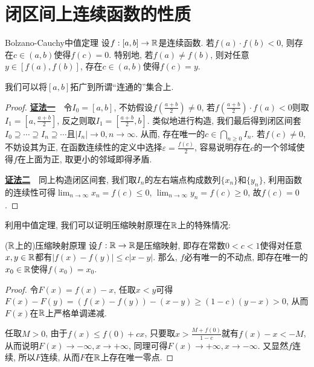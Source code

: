 \newpage
\section{闭区间上连续函数的性质}

\begin{theorem}{Bolzano-Cauchy中值定理}
	设$f:[a,b] \to \mathbb{R}$是连续函数. 若$f(a) \cdot f(b) <0$, 则存在$c \in (a,b)$使得$f(c)=0$. 特别地, 若$f(a) \neq f(b)$, 则对任意$y \in [f(a),f(b)]$, 存在$c \in (a,b)$使得$f(c)=y$. 
\end{theorem}
\begin{remark}
	我们可以将$[a,b]$拓广到所谓“连通的”集合上. 
\end{remark}
\begin{proof}
	\underline{\textbf{证法一}}~~令$I_0=[a,b]$, 不妨假设$f(\frac{a+b}{2}) \neq 0$, 若$f(\frac{a+b}{2}) \cdot f(a)<0$则取$I_1=[a,\frac{a+b}{2}]$, 反之则取$I_1=[\frac{a+b}{2},b]$. 类似地进行构造, 我们最后得到闭区间套$I_0 \supseteq \cdots \supseteq I_n \supseteq \cdots$且$|I_n|\to 0,n \to \infty$. 从而, 存在唯一的$c \in \bigcap_{n\geq 0}I_n$. 若$f(c) \neq 0$, 不妨设其为正, 在函数连续性的定义中选择$\varepsilon = \frac{f(c)}{2}$, 容易说明存在$c$的一个邻域使得$f$在上面为正, 取更小的邻域即得矛盾. 
	
	\underline{\textbf{证法二}}~~同上构造闭区间套, 我们取$I_n$的左右端点构成数列$\{ x_n \}$和$\{ y_n \}$, 利用函数的连续性可得$\lim_{n\to \infty} x_n = f(c) \leq 0$, $\lim_{n\to \infty} y_n = f(c) \geq 0$, 故$f(c)=0$. 
\end{proof}

利用中值定理, 我们可以证明压缩映射原理在$\mathbb{R}$上的特殊情况: 

\begin{proposition}{($\mathbb{R}$上的)压缩映射原理}
	设$f:\mathbb{R} \to \mathbb{R}$是压缩映射, 即存在常数$0 < c < 1$使得对任意$x,y \in \mathbb{R}$都有$|f(x)-f(y)| \leq c|x-y|$. 那么, $f$必有唯一的不动点, 即存在唯一的$x_0 \in \mathbb{R}$使得$f(x_0)=x_0$. 
\end{proposition}
\begin{proof}
	令$F(x) = f(x) - x$, 任取$x<y$可得$F(x)-F(y) = (f(x)-f(y)) - (x-y) \geq (1-c)(y-x) >0$, 从而$F(x)$在$\mathbb{R}$上严格单调递减. 
	
	任取$M>0$, 由于$f(x) \leq f(0)+cx$, 只要取$x > \frac{M+f(0)}{1-c}$就有$f(x)-x<-M$, 从而说明$F(x) \to -\infty ,x \to +\infty$, 同理可得$F(x) \to +\infty ,x \to -\infty$. 又显然$f$连续, 所以$F$连续, 从而$F$在$\mathbb{R}$上存在唯一零点. 
\end{proof}


